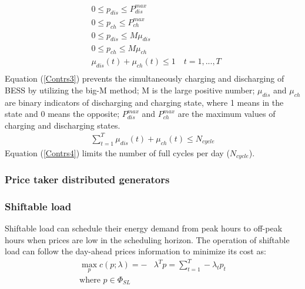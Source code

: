 \documentclass[journal]{IEEEtran}
\begin{document}
\begin{equation}
  \label{Contrs3}
  \begin{aligned}
    & 0 \leq p_{dis} \leq P_{dis}^{max} \\
    & 0 \leq p_{ch} \leq P_{ch}^{max}  \\
    & 0 \leq p_{dis} \leq M \mu_{dis}   \\
    & 0 \leq p_{ch} \leq M \mu_{ch}     \\
    & \mu_{dis}(t) + \mu_{ch}(t) \leq 1 \quad t=1,...,T\\
  \end{aligned}
\end{equation}
Equation (\ref{Contrs3}) prevents the simultaneously charging and discharging of BESS by utilizing the big-M method; M is the large positive number; $\mu_{dis}$ and $\mu_{ch}$ are binary indicators of discharging and charging state, where 1 means in the state and 0 means the opposite; $P_{dis}^{max}$ and $P_{ch}^{max}$ are the maximum values of charging and discharging states.
\begin{equation}
  \label{Contrs4}
  \begin{aligned}
    \sum_{t=1}^T \mu_{dis}(t) + \mu_{ch}(t) \leq N_{cycle}
  \end{aligned}
\end{equation}
Equation (\ref{Contrs4}) limits the number of full cycles per day ($N_{cycle}$).


\subsubsection{Price taker distributed generators}

\subsubsection{Shiftable load}
Shiftable load can schedule their energy demand from peak hours to off-peak hours when prices are low in the scheduling horizon. The operation of shiftable load can follow the day-ahead prices information to minimize its cost as: 
\begin{equation}
  \label{SLobj}
  \begin{aligned}
    \max_{p} c(p; \lambda) = - &\lambda^T p = \sum_{t=1}^T - \lambda_t p_t \\
    \text{where }  p \in \Phi_{SL} \\
  \end{aligned}
\end{equation}
\end{document}
